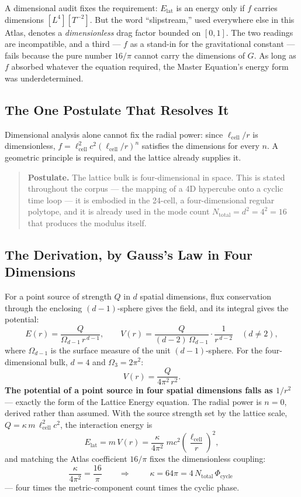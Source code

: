 \documentclass[12pt,oneside]{book}
\begin{document}
A dimensional audit fixes the requirement: $E_{\text{lat}}$ is an energy only if
$f$ carries dimensions $[L^4][T^{-2}]$. But the word ``slipstream,'' used
everywhere else in this Atlas, denotes a \emph{dimensionless} drag factor bounded
on $[0,1]$. The two readings are incompatible, and a third --- $f$ as a stand-in
for the gravitational constant --- fails because the pure number $16/\pi$ cannot
carry the dimensions of $G$. As long as $f$ absorbed whatever the equation
required, the Master Equation's energy form was underdetermined.

\subsection{The One Postulate That Resolves It}

Dimensional analysis alone cannot fix the radial power: since $\ell_{\text{cell}}/r$
is dimensionless, $f = \ell_{\text{cell}}^2 c^2 (\ell_{\text{cell}}/r)^n$ satisfies
the dimensions for every $n$. A geometric principle is required, and the lattice
already supplies it.

\begin{quote}
\textbf{Postulate.} The lattice bulk is four-dimensional in space. This is stated
throughout the corpus --- the mapping of a 4D hypercube onto a cyclic time loop ---
it is embodied in the 24-cell, a four-dimensional regular polytope, and it is
already used in the mode count $N_{\text{total}} = d^2 = 4^2 = 16$ that produces
the modulus itself.
\end{quote}

\subsection{The Derivation, by Gauss's Law in Four Dimensions}

For a point source of strength $Q$ in $d$ spatial dimensions, flux conservation
through the enclosing $(d{-}1)$-sphere gives the field, and its integral gives the
potential:
\[
E(r) = \frac{Q}{\Omega_{d-1}\,r^{\,d-1}},
\qquad
V(r) = \frac{Q}{(d-2)\,\Omega_{d-1}}\cdot\frac{1}{r^{\,d-2}}
\quad (d \neq 2),
\]
where $\Omega_{d-1}$ is the surface measure of the unit $(d{-}1)$-sphere. For the
four-dimensional bulk, $d=4$ and $\Omega_3 = 2\pi^2$:
\[
V(r) = \frac{Q}{4\pi^2\,r^2}.
\]
\textbf{The potential of a point source in four spatial dimensions falls as
$1/r^2$} --- exactly the form of the Lattice Energy equation. The radial power is
$n=0$, derived rather than assumed. With the source strength set by the lattice
scale, $Q = \kappa\,m\,\ell_{\text{cell}}^2 c^2$, the interaction energy is
\[
E_{\text{lat}} = m\,V(r)
= \frac{\kappa}{4\pi^2}\;m c^2 \left(\frac{\ell_{\text{cell}}}{r}\right)^2,
\]
and matching the Atlas coefficient $16/\pi$ fixes the dimensionless coupling:
\[
\frac{\kappa}{4\pi^2} = \frac{16}{\pi}
\qquad\Longrightarrow\qquad
\boxed{\;\kappa = 64\pi = 4\,N_{\text{total}}\,\Phi_{\text{cycle}}\;}
\]
--- four times the metric-component count times the cyclic phase.
\end{document}
